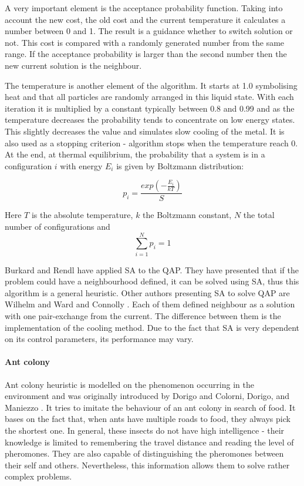 \documentclass[english,a4paper,twoside]{ppfcmthesis}
\begin{document}
A very important element is the acceptance probability function.
Taking into account the new cost, the old cost and the current temperature it calculates a number between 0 and 1.
The result is a guidance whether to switch solution or not.
This cost is compared with a randomly generated number from the same range.
If the acceptance probability is larger than the second number then the new current solution is the neighbour.

The temperature is another element of the algorithm.
It starts at 1.0 symbolising heat and that all particles are randomly arranged in this liquid state.
With each iteration it is multiplied by a constant typically between 0.8 and 0.99 and as the temperature decreases the probability tends to concentrate on low energy states.
This slightly decreases the value and simulates slow cooling of the metal.
It is also used as a stopping criterion - algorithm stops when the temperature reach 0.
At the end, at thermal equilibrium, the probability that a system is in a configuration $i$ with energy $E_i$ is given by Boltzmann distribution:

\begin{equation}
  p_i = \frac{exp(-\frac{E_i}{kT})}{S}
\end{equation}

Here $T$ is the absolute temperature, $k$ the Boltzmann constant, $N$ the total number of configurations and
\begin{equation}
  \sum_{i=1}^{N} p_i = 1
\end{equation}

Burkard and Rendl \cite{burkard1984thermodynamically} have applied SA to the QAP.
They have presented that if the problem could have a neighbourhood defined, it can be solved using SA, thus this algorithm is a general heuristic.
Other authors presenting SA to solve QAP are Wilhelm and Ward \cite{wilhelm1987solving} and Connolly \cite{connolly1990improved}.
Each of them defined neighbour as a solution with one pair-exchange from the current.
The difference between them is the implementation of the cooling method.
Due to the fact that SA is very dependent on its control parameters, its performance may vary.

\paragraph{Ant colony}

Ant colony heuristic is modelled on the phenomenon occurring in the environment and was originally introduced by Dorigo \cite{dorigo1992optimization} and Colorni, Dorigo, and Maniezzo \cite{dorigo1996ant}.
It tries to imitate the behaviour of an ant colony in search of food.
It bases on the fact that, when ants have multiple roads to food, they always pick the shortest one.
In general, these insects do not have high intelligence - their knowledge is limited to remembering the travel distance and reading the level of pheromones.
They are also capable of distinguishing the pheromones between their self and others.
Nevertheless, this information allows them to solve rather complex problems.
\end{document}
